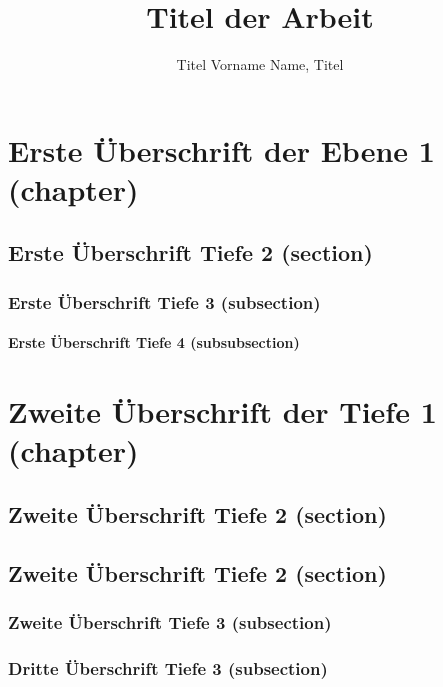 \documentclass[BMR,Bachelor,english,Harvard]{twbook}%
\title{Titel der Arbeit}
\author{Titel Vorname Name, Titel}
\begin{document}
\maketitle

%
%
\chapter{Erste Überschrift der Ebene 1 (chapter)}
\blinddocument

\blindmathpaper

\section{Erste Überschrift Tiefe 2 (section)}
\blindtext

\subsection{Erste Überschrift Tiefe 3 (subsection)}
\blindtext

\subsubsection{Erste Überschrift Tiefe 4 (subsubsection)}
\blindtext

\chapter{Zweite Überschrift der Tiefe 1 (chapter)}
\blindtext

\section{Zweite Überschrift Tiefe 2 (section)}
\blindtext

\section{Zweite Überschrift Tiefe 2 (section)}
\blindtext

\subsection{Zweite Überschrift Tiefe 3 (subsection)}
\blindtext

\subsection{Dritte Überschrift Tiefe 3 (subsection)}
\blindtext
\end{document}
